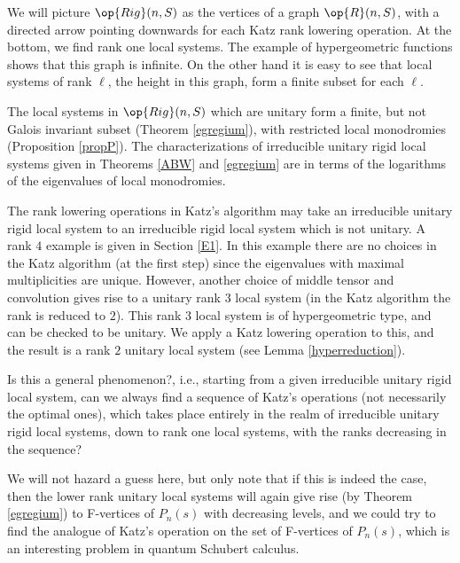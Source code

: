 We will picture $\op{Rig}(n,S)$  as the vertices of a graph  $\op{R}(n,S)$, with a directed arrow pointing downwards for each Katz rank lowering operation.  At the bottom, we find rank one local systems. The example of hypergeometric functions
 \cite[Theorem 3.5]{BH} shows that this graph is infinite. On the other hand it is easy to see that local systems of rank $\ell$, the height in this graph, form a finite subset for each $\ell$.

 The local systems in $\op{Rig}(n,S)$  which are unitary form a   finite, but not Galois invariant subset (Theorem \ref{egregium}), with restricted local monodromies (Proposition \ref{propP}). The characterizations of irreducible unitary rigid local systems given in Theorems \ref{ABW} and \ref{egregium} are  in terms  of the logarithms of the eigenvalues of local monodromies.



The rank lowering operations in Katz's algorithm may take an irreducible unitary rigid local system
to an irreducible rigid local system which is not unitary. A rank $4$ example  is given in Section \ref{E1}. In this example there  are no choices in the Katz algorithm (at the first step) since the eigenvalues with maximal multiplicities are unique. However, another  choice of middle tensor and convolution gives rise  to a unitary rank $3$ local system (in the Katz algorithm the rank is reduced to $2$). This rank $3$ local system is of hypergeometric type, and can be checked to be unitary. We apply a Katz lowering operation to this, and the result is a rank $2$ unitary local system (see Lemma \ref{hyperreduction}).
\begin{question}
\notready\label{genphen}
Is this a general phenomenon?, i.e., starting from a given irreducible unitary rigid local system, can we always find a sequence of Katz's operations (not necessarily the optimal ones), which  takes place entirely in the realm of irreducible unitary rigid local systems, down to rank one local systems, with the ranks decreasing in the sequence?
\end{question}
We will not hazard a guess here, but only note that if this is indeed the case, then the lower rank unitary local systems will again give rise (by Theorem \ref{egregium}) to F-vertices of $P_n(s)$ with decreasing levels, and we could try to find the analogue of Katz's operation on the set of F-vertices of $P_n(s)$, which is an interesting problem in quantum Schubert calculus.

